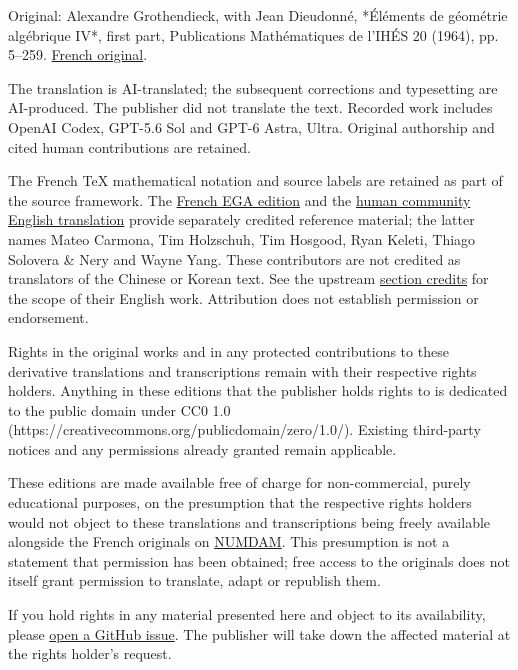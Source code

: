 \begingroup\small
Original: Alexandre Grothendieck, with Jean Dieudonné, *Éléments de géométrie algébrique IV*, first part, Publications Mathématiques de l’IHÉS 20 (1964), pp. 5–259. \href{https://numdam.org/item/PMIHES\_1964\_\_20\_\_5\_0/}{French original}.

The translation is AI-translated; the subsequent corrections and typesetting are AI-produced. The publisher did not translate the text. Recorded work includes OpenAI Codex, GPT-5.6 Sol and GPT-6 Astra, Ultra. Original authorship and cited human contributions are retained.

The French TeX mathematical notation and source labels are retained as part of the source framework. The \href{https://github.com/KokunoYumeto/ega-fr/releases/tag/ega-fr-2026-10-24-r19}{French EGA edition} and the \href{https://github.com/ryankeleti/ega/tree/3d7afe28c99d1887ccdb85acf2ca1afd93fb1971}{human community English translation} provide separately credited reference material; the latter names Mateo Carmona, Tim Holzschuh, Tim Hosgood, Ryan Keleti, Thiago Solovera \& Nery and Wayne Yang. These contributors are not credited as translators of the Chinese or Korean text. See the upstream \href{https://github.com/ryankeleti/ega/blob/3d7afe28c99d1887ccdb85acf2ca1afd93fb1971/README.md}{section credits} for the scope of their English work. Attribution does not establish permission or endorsement.

Rights in the original works and in any protected contributions to these derivative translations and transcriptions remain with their respective rights holders. Anything in these editions that the publisher holds rights to is dedicated to the public domain under CC0 1.0 (https://creativecommons.org/publicdomain/zero/1.0/). Existing third-party notices and any permissions already granted remain applicable.

These editions are made available free of charge for non-commercial, purely educational purposes, on the presumption that the respective rights holders would not object to these translations and transcriptions being freely available alongside the French originals on \href{https://www.numdam.org/journals/PMIHES/}{NUMDAM}. This presumption is not a statement that permission has been obtained; free access to the originals does not itself grant permission to translate, adapt or republish them.

If you hold rights in any material presented here and object to its availability, please \href{https://github.com/KokunoYumeto/ega-zh-hans-cn/issues}{open a GitHub issue}. The publisher will take down the affected material at the rights holder's request.

\par\endgroup\clearpage

